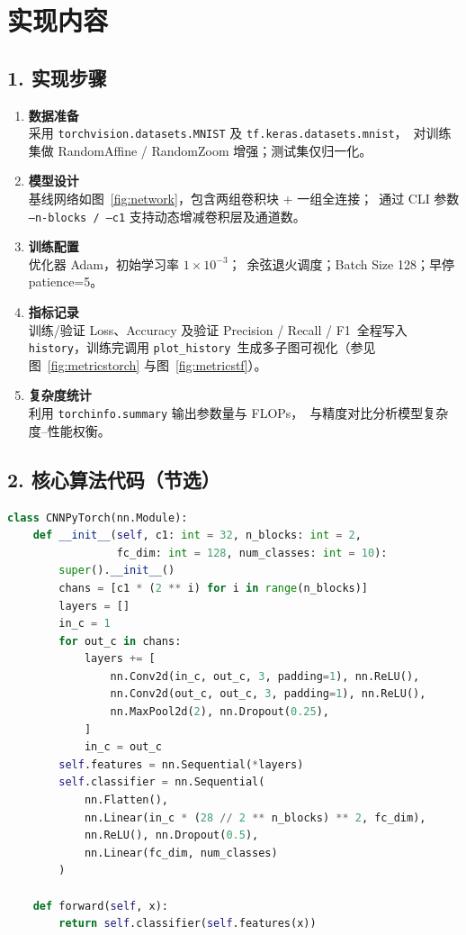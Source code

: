 \documentclass[UTF8]{article}
\begin{document}
\section*{实现内容}

\subsection*{1. 实现步骤}
\begin{enumerate}
    \item \textbf{数据准备}\\
          采用 \texttt{torchvision.datasets.MNIST} 及 \texttt{tf.keras.datasets.mnist}，\
          对训练集做 RandomAffine / RandomZoom 增强；测试集仅归一化。
    \item \textbf{模型设计}\\
          基线网络如图~\ref{fig:network}，包含两组卷积块 + 一组全连接；\
          通过 CLI 参数 \texttt{--n-blocks / --c1} 支持动态增减卷积层及通道数。
    \item \textbf{训练配置}\\
          优化器 Adam，初始学习率 $1\times10^{-3}$；\
          余弦退火调度；Batch Size 128；早停 patience=5。
    \item \textbf{指标记录}\\
          训练/验证 Loss、Accuracy 及验证 Precision / Recall / F1\
          全程写入 \texttt{history}，训练完调用 \texttt{plot\_history}\
          生成多子图可视化（参见图~\ref{fig:metricstorch} 与图~\ref{fig:metricstf}）。
    \item \textbf{复杂度统计}\\
          利用 \texttt{torchinfo.summary} 输出参数量与 FLOPs，\
          与精度对比分析模型复杂度--性能权衡。
\end{enumerate}

\subsection*{2. 核心算法代码（节选）}
\begin{lstlisting}[language=Python, caption=PyTorch 动态深度 CNN, label=code:cnn_torch]
class CNNPyTorch(nn.Module):
    def __init__(self, c1: int = 32, n_blocks: int = 2,
                 fc_dim: int = 128, num_classes: int = 10):
        super().__init__()
        chans = [c1 * (2 ** i) for i in range(n_blocks)]
        layers = []
        in_c = 1
        for out_c in chans:
            layers += [
                nn.Conv2d(in_c, out_c, 3, padding=1), nn.ReLU(),
                nn.Conv2d(out_c, out_c, 3, padding=1), nn.ReLU(),
                nn.MaxPool2d(2), nn.Dropout(0.25),
            ]
            in_c = out_c
        self.features = nn.Sequential(*layers)
        self.classifier = nn.Sequential(
            nn.Flatten(),
            nn.Linear(in_c * (28 // 2 ** n_blocks) ** 2, fc_dim),
            nn.ReLU(), nn.Dropout(0.5),
            nn.Linear(fc_dim, num_classes)
        )

    def forward(self, x):
        return self.classifier(self.features(x))
\end{lstlisting}
\end{document}
